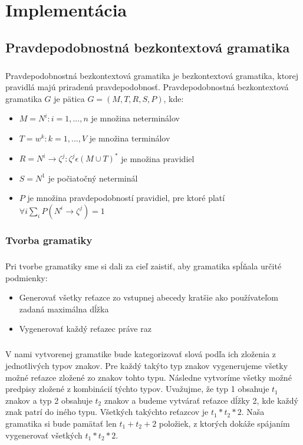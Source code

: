 \chapter{Implementácia}

\section{Pravdepodobnostná bezkontextová gramatika}
\paragraph{}
Pravdepodobnostná bezkontextová gramatika je bezkontextová gramatika, ktorej pravidlá majú priradenú pravdepodobnosť. Pravdepodobnostná bezkontextová gramatika \(G\) je pätica \(G = (M, T, R, S, P)\), kde:
\begin{itemize}
	\item \(M = { N^i : i = 1,...,n }\) je množina neterminálov
	\item \(T = { w^k : k = 1,...,V }\) je množina terminálov
	\item \(R = { N^i \to \zeta^j : \zeta^j \epsilon (M \cup T)^* }\) je množina pravidiel
	\item \(S = N^1\) je počiatočný neterminál
	\item \(P\) je množina pravdepodobností pravidiel, pre ktoré platí \( \forall i \displaystyle\sum_{i} P(N^i \to \zeta^j) = 1\)
\end{itemize}

\subsection{Tvorba gramatiky}
\paragraph{}
Pri tvorbe gramatiky sme si dali za cieľ zaistiť, aby gramatika spĺňala určité podmienky:
\begin{itemize}
	\item Generovať všetky reťazce zo vstupnej abecedy kratšie ako používateľom zadaná maximálna dĺžka
	\item Vygenerovať každý reťazec práve raz
\end{itemize}

\paragraph{}
V nami vytvorenej gramatike bude kategorizovať slová podľa ich zloženia z jednotlivých typov znakov. Pre každý takýto typ znakov vygenerujeme všetky možné reťazce zložené zo znakov tohto typu. Následne vytvoríme všetky možné predpisy zložené z kombinácií týchto typov. Uvažujme, že typ 1 obsahuje \(t_1\) znakov a typ 2 obsahuje \(t_2\) znakov a budeme vytvárať reťazce dĺžky 2, kde každý znak patrí do iného typu. Všetkých takýchto reťazcov je \(t_1 * t_2 * 2\). Naša gramatika si bude pamätať len \(t_1 + t_2 + 2\) položiek, z ktorých dokáže spájaním vygenerovať všetkých \(t_1 * t_2 * 2\).


